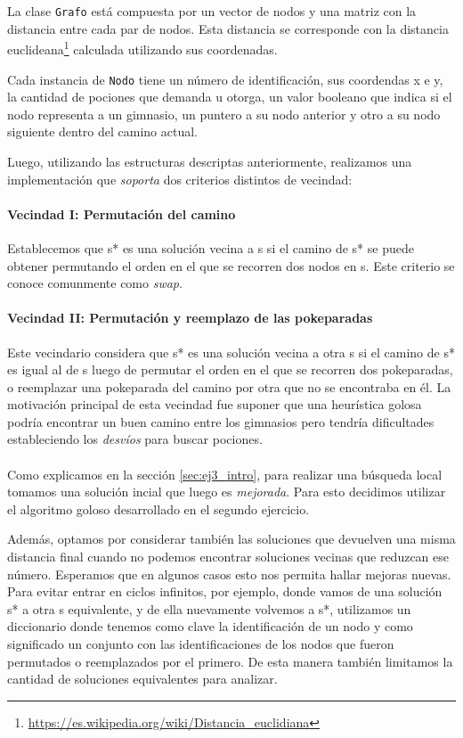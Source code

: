 La clase \texttt{Grafo} est\'a compuesta por un vector de nodos y una matriz con la distancia entre cada par de nodos. Esta distancia se corresponde con la distancia euclideana\footnote{\url{https://es.wikipedia.org/wiki/Distancia_euclidiana}} calculada utilizando sus coordenadas.

Cada instancia de \texttt{Nodo} tiene un n\'umero de identificaci\'on, sus coordendas x e y, la cantidad de pociones que demanda u otorga, un valor booleano que indica si el nodo representa a un gimnasio, un puntero a su nodo anterior y otro a su nodo siguiente dentro del camino actual.

Luego, utilizando las estructuras descriptas anteriormente, realizamos una implementaci\'on que \textit{soporta} dos criterios distintos de vecindad:

\paragraph{Vecindad I: Permutaci\'on del camino}
Establecemos que s* es una soluci\'on vecina a s si el camino de s* se puede obtener permutando el orden en el que se recorren dos nodos en s. Este criterio se conoce comunmente como \textit{swap}.

\paragraph{Vecindad II: Permutaci\'on y reemplazo de las pokeparadas}
Este vecindario considera que s* es una soluci\'on vecina a otra s si el camino de s* es igual al de s luego de permutar el orden en el que se recorren dos pokeparadas, o reemplazar una pokeparada del camino por otra que no se encontraba en \'el. La motivaci\'on principal de esta vecindad fue suponer que una heur\'istica golosa podr\'ia encontrar un buen camino entre los gimnasios pero tendr\'ia dificultades estableciendo los \textit{desv\'ios} para buscar pociones.

\paragraph{}
Como explicamos en la secci\'on \ref{sec:ej3_intro}, para realizar una b\'usqueda local tomamos una soluci\'on incial que luego es \textit{mejorada}. Para esto decidimos utilizar el algoritmo goloso desarrollado en el segundo ejercicio.

Adem\'as, optamos por considerar tambi\'en las soluciones que devuelven una misma distancia final cuando no podemos encontrar soluciones vecinas que reduzcan ese n\'umero. Esperamos que en algunos casos esto nos permita hallar mejoras nuevas. Para evitar entrar en ciclos infinitos, por ejemplo, donde vamos de una soluci\'on s* a otra s equivalente, y de ella nuevamente volvemos a s*, utilizamos un diccionario donde tenemos como clave la identificaci\'on de un nodo y como significado un conjunto con las identificaciones de los nodos que fueron permutados o reemplazados por el primero. De esta manera tambi\'en limitamos la cantidad de soluciones equivalentes para analizar.

